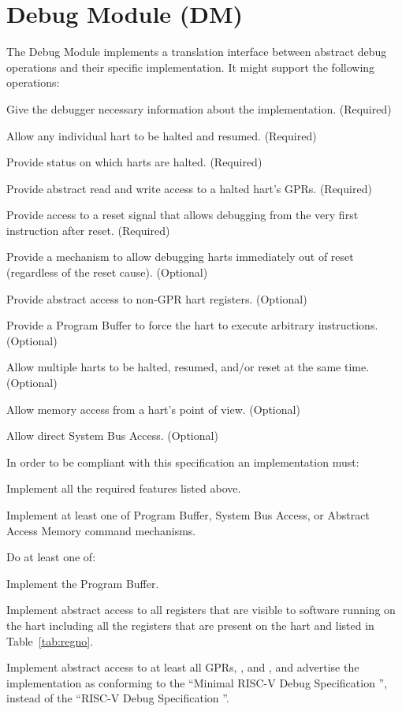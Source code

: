 \chapter{Debug Module (DM)} \label{dm}

\begin{steps}{The Debug Module implements a translation interface between abstract debug
    operations and their specific implementation. It might support the following
    operations:}
\item Give the debugger necessary information about the implementation. (Required)
\item Allow any individual hart to be halted and resumed. (Required)
\item Provide status on which harts are halted. (Required)
\item Provide abstract read and write access to a halted hart's GPRs. (Required)
\item Provide access to a reset signal that allows debugging from the very
    first instruction after reset. (Required)
\item Provide a mechanism to allow debugging harts immediately out of reset
      (regardless of the reset cause). (Optional)
\item Provide abstract access to non-GPR hart registers. (Optional)
\item Provide a Program Buffer to force the hart to execute arbitrary instructions. (Optional)
\item Allow multiple harts to be halted, resumed, and/or reset at the same time. (Optional)
\item Allow memory access from a hart's point of view. (Optional)
\item Allow direct System Bus Access. (Optional)
\end{steps}

\begin{steps}{In order to be compliant with this specification an
    implementation must:}
\item Implement all the required features listed above.
\item Implement at least one of Program Buffer, System Bus Access, or Abstract
    Access Memory command mechanisms.
\item
    \begin{steps}{Do at least one of:}
        \item Implement the Program Buffer.
        \item Implement abstract access to all registers that are visible to
            software running on the hart including all the registers that are
            present on the hart and listed in Table~\ref{tab:regno}.
        \item Implement abstract access to at least all GPRs, \Rdcsr, and
            \Rdpc, and advertise the implementation as conforming to the
            ``Minimal RISC-V Debug Specification \versionnum'', instead of the
            ``RISC-V Debug Specification \versionnum''.
    \end{steps}
\end{steps}

